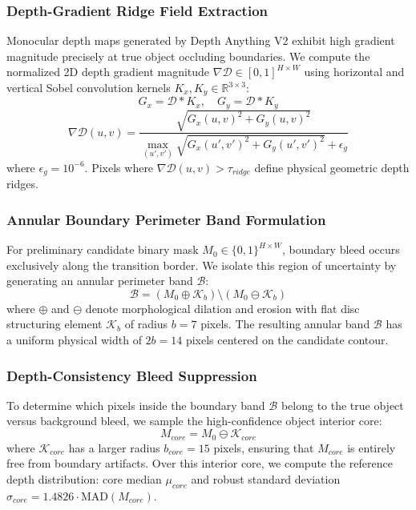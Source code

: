 \documentclass[10pt,twocolumn,letterpaper]{article}
\begin{document}
\subsubsection{Depth-Gradient Ridge Field Extraction}
Monocular depth maps generated by Depth Anything V2 exhibit high gradient magnitude precisely at true object occluding boundaries. We compute the normalized 2D depth gradient magnitude $\nabla \mathcal{D} \in [0, 1]^{H \times W}$ using horizontal and vertical Sobel convolution kernels $K_x, K_y \in \mathbb{R}^{3 \times 3}$:
\begin{equation}
G_x = \mathcal{D} * K_x, \quad G_y = \mathcal{D} * K_y
\end{equation}
\begin{equation}
\nabla \mathcal{D}(u,v) = \frac{\sqrt{G_x(u,v)^2 + G_y(u,v)^2}}{\max_{(u',v')} \sqrt{G_x(u',v')^2 + G_y(u',v')^2} + \epsilon_g}
\end{equation}
where $\epsilon_g = 10^{-6}$. Pixels where $\nabla \mathcal{D}(u,v) > \tau_{ridge}$ define physical geometric depth ridges.

\subsubsection{Annular Boundary Perimeter Band Formulation}
For preliminary candidate binary mask $M_0 \in \{0, 1\}^{H \times W}$, boundary bleed occurs exclusively along the transition border. We isolate this region of uncertainty by generating an annular perimeter band $\mathcal{B}$:
\begin{equation}
\mathcal{B} = (M_0 \oplus \mathcal{K}_b) \setminus (M_0 \ominus \mathcal{K}_b)
\end{equation}
where $\oplus$ and $\ominus$ denote morphological dilation and erosion with flat disc structuring element $\mathcal{K}_b$ of radius $b = 7$ pixels. The resulting annular band $\mathcal{B}$ has a uniform physical width of $2b = 14$ pixels centered on the candidate contour.

\subsubsection{Depth-Consistency Bleed Suppression}
To determine which pixels inside the boundary band $\mathcal{B}$ belong to the true object versus background bleed, we sample the high-confidence object interior core:
\begin{equation}
M_{core} = M_0 \ominus \mathcal{K}_{core}
\end{equation}
where $\mathcal{K}_{core}$ has a larger radius $b_{core} = 15$ pixels, ensuring that $M_{core}$ is entirely free from boundary artifacts. Over this interior core, we compute the reference depth distribution: core median $\mu_{core}$ and robust standard deviation $\sigma_{core} = 1.4826 \cdot \mathrm{MAD}(M_{core})$.
\end{document}
